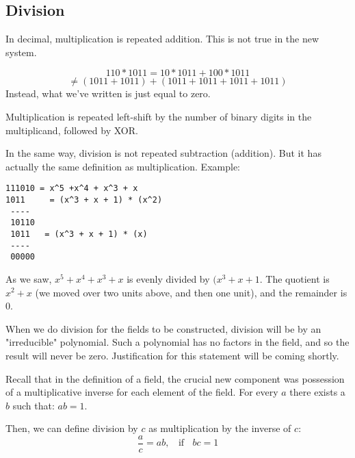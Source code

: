 \documentclass[11pt, oneside]{article}
\begin{document}
\subsection*{Division}
In decimal, multiplication is repeated addition.  This is not true in the new system.
 
\[ 110 * 1011 = 10 * 1011 + 100 * 1011 \]
\[ \ne (1011 + 1011) + (1011 + 1011 + 1011 + 1011) \]
Instead, what we've written is just equal to zero.

Multiplication is repeated left-shift by the number of  binary digits in the multiplicand, followed by XOR.

In the same way, division is not repeated subtraction (addition).  But it has actually the same definition as multiplication.  Example:

\begin{verbatim}
111010 = x^5 +x^4 + x^3 + x
1011     = (x^3 + x + 1) * (x^2)
 ----
 10110
 1011   = (x^3 + x + 1) * (x)
 ----
 00000
\end{verbatim}

As we saw, $x^5 +x^4 + x^3 + x$ is evenly divided by $(x^3 + x + 1$.  The quotient is $x^2 + x$ (we moved over two units above, and then one unit), and the remainder is $0$.

When we do division for the fields to be constructed, division will be by an "irreducible" polynomial.  Such a polynomial has no factors in the field, and so the result will never be zero.  Justification for this statement will be coming shortly.

Recall that in the definition of a field, the crucial new component was possession of a multiplicative inverse for each element of the field.  For every $a$ there exists a $b$ such that:   $ab = 1$.

Then, we can define division by $c$ as multiplication by the inverse of $c$:
\[ \frac{a}{c} = ab, \ \ \ \ \text{if} \ \ \ \ bc = 1 \]
\end{document}
